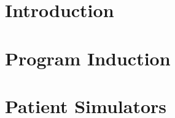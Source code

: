 \usepackage{lipsum}




\coverpage{\TITLE}{\SUBTITLE}{\AUTHOR}{\DATE}{\SUBJECT}

\newpage



\tableofcontents

\listoffigures

\listoftables


\printnomenclature

\part{Introduction}
\label{part:intro}

\newpage


\newpage


\newpage


\part{Program Induction}
\label{part:proginduction}

\newpage


\newpage


\newpage


\newpage


\newpage


\newpage


\part{Patient Simulators}
\label{part:simulators}

